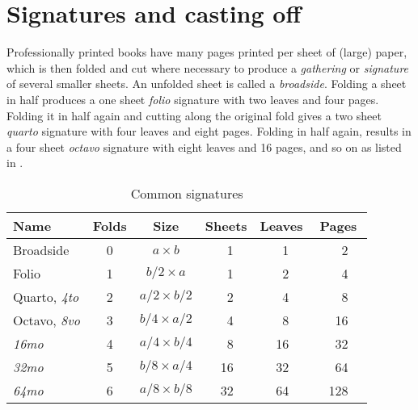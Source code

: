 \documentclass[10pt,a4paper,extrafontsizes]{memoir}
\begin{document}
\section{Signatures and casting off}

\begin{paracol}{2}
\switchEng
    Professionally printed books have many pages printed per sheet of (large)
paper, which is then folded and cut where necessary to produce a 
\emph{gathering} or \emph{signature} of several smaller 
sheets. An 
unfolded sheet is called a \emph{broadside}. 
Folding a sheet in half produces a one sheet 
\emph{folio} signature with two leaves and four pages. 
Folding it in half again and cutting along the original fold gives a 
two sheet \emph{quarto} signature with four leaves
and eight pages. 
Folding in half again, 
results in a four sheet \emph{octavo} signature with eight
leaves and 16 pages, and so on as listed in .
\end{paracol}

\begin{table}
\centering
\caption{Common signatures} \label{tab:signatures}
\begin{tabular}{lcccrccrccrc} \toprule
Name      & Folds & Size             & \multicolumn{3}{c}{Sheets} & 
\multicolumn{3}{c}{Leaves} & \multicolumn{3}{c}{Pages} \\ \midrule
Broadside & 0     & $a \times b$     & &  1 & & &  1 & & &   2 & \\
Folio     & 1     & $b/2 \times a$   & &  1 & & &  2 & & &   4 & \\
Quarto, \emph{4to} & 2 & $a/2 \times b/2$ & & 2 & & & 4 & & & 8 & \\
Octavo, \emph{8vo} & 3 & $b/4 \times a/2$ & & 4 & & & 8 & & & 16 & \\
\emph{16mo} & 4   & $a/4 \times b/4$ & &  8 & & & 16 & & &  32 & \\
\emph{32mo} & 5   & $b/8 \times a/4$ & & 16 & & & 32 & & &  64 & \\
\emph{64mo} & 6   & $a/8 \times b/8$ & & 32 & & & 64 & & & 128 & \\ \bottomrule
\end{tabular}%
%
%
\end{table}
\end{document}
